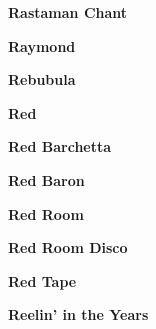 \begin{center}\textbf{Rastaman Chant}\end{center}
\newline
\vspace{10pt} 
\begin{center}\textbf{Raymond}\end{center}
\newline
\vspace{10pt} 
\begin{center}\textbf{Rebubula}\end{center}
\newline
\vspace{10pt} 
\begin{center}\textbf{Red}\end{center}
\newline
\vspace{10pt} 
\begin{center}\textbf{Red Barchetta}\end{center}
\newline
\vspace{10pt} 
\begin{center}\textbf{Red Baron}\end{center}
\newline
\vspace{10pt} 
\begin{center}\textbf{Red Room}\end{center}
\newline
\vspace{10pt} 
\begin{center}\textbf{Red Room Disco}\end{center}
\newline
\vspace{10pt} 
\begin{center}\textbf{Red Tape}\end{center}
\newline
\vspace{10pt} 
\begin{center}\textbf{Reelin' in the Years}\end{center}
\newline
